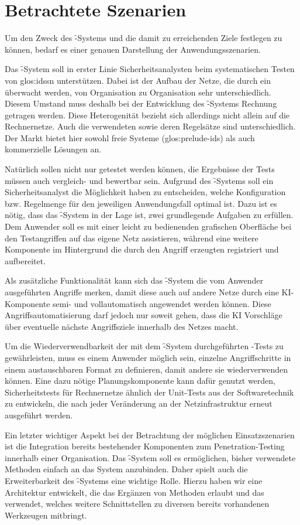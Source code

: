 
\section{Betrachtete Szenarien}
\label{sec:motivation:scenario}

\authors{\DE \and \JF}{\WF \and \LM \and \MW \and \DH}

Um den Zweck des \f-Systems und die damit zu erreichenden Ziele
festlegen zu können, bedarf es einer genauen Darstellung der
Anwendungsszenarien.

Das \f-System soll in erster Linie Sicherheitsanalysten beim
systematischen Testen von \glspl{glos:ids}n unterstützen. Dabei ist
der Aufbau der Netze, die durch ein  überwacht werden, von
Organisation zu Organisation sehr unterschiedlich. Diesem Umstand muss
deshalb bei der Entwicklung des \f-Systems Rechnung getragen
werden. Diese Heterogenität bezieht sich allerdings nicht allein auf
die Rechnernetze. Auch die verwendeten  sowie deren
Regelsätze sind unterschiedlich. Der Markt bietet hier sowohl freie
Systeme (\zB \gls{glos:prelude-ids}) als auch kommerzielle Lösungen an.

Natürlich sollen  nicht nur getestet werden können,
die Ergebnisse der Tests müssen auch vergleich- und bewertbar
sein. Aufgrund des \f-Systems soll ein Sicherheitsanalyst die
Möglichkeit haben zu entscheiden, welche Konfiguration bzw. Regelmenge
für den jeweiligen Anwendungsfall optimal ist. Dazu ist es nötig, dass
das \f-System in der Lage ist, zwei grundlegende Aufgaben zu
erfüllen. Dem Anwender soll es mit einer leicht zu bedienenden
grafischen Oberfläche bei den Testangriffen auf das eigene Netz
assistieren, während eine weitere Komponente im Hintergrund die durch
den Angriff erzeugten  registriert und
aufbereitet.

Als zusätzliche Funktionalität kann sich das \f-System die vom
Anwender ausgeführten Angriffe merken, damit diese auch auf andere
Netze durch eine KI-Komponente semi- und vollautomatisch angewendet
werden können. Diese Angriffsautomatisierung darf jedoch nur soweit
gehen, dass die KI Vorschläge über eventuelle nächste Angriffsziele
innerhalb des Netzes macht.

Um die Wiederverwendbarkeit der mit dem \f-System durchgeführten
-Tests zu gewährleisten, muss es einem Anwender möglich sein,
einzelne Angriffschritte in einem austauschbaren Format zu definieren,
damit andere sie wiederverwenden können. Eine dazu nötige
Planungskomponente kann dafür genutzt werden, Sicherheitstests für
Rechnernetze ähnlich der Unit-Tests aus der Softwaretechnik zu
entwickeln, die nach jeder Veränderung an der Netzinfrastruktur erneut
ausgeführt werden.

Ein letzter wichtiger Aspekt bei der Betrachtung der möglichen
Einsatzszenarien ist die Integration bereits bestehender Komponenten
zum Penetration-Testing innerhalb einer Organisation. Das
\f-System soll es ermöglichen, bisher verwendete Methoden einfach
an das System anzubinden. Daher spielt auch die Erweiterbarkeit des
\f-Systems eine wichtige Rolle. Hierzu haben wir eine Architektur
entwickelt, die das Ergänzen von Methoden erlaubt und das 
verwendet, welches weitere Schnittstellen zu diversen bereits
vorhandenen Werkzeugen mitbringt. 